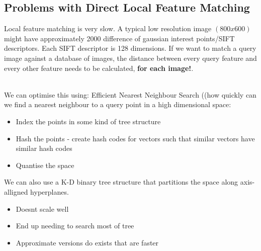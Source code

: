 \subsection{Problems with Direct Local Feature Matching}

Local feature matching is very slow. A typical low resolution image $(800x600)$ might have approximately 2000 difference of gaussian interest points/SIFT descriptors. Each SIFT descriptor is 128 dimensions. If we want to match a query image against a database of images, the distance between every query feature and every other feature needs to be calculated, \textbf{for each image!}.

\\

\noindent We can optimise this using: Efficient Nearest Neighbour Search ((how quickly can we find a nearest neighbour to a query point in a high dimensional space:

\begin{itemize}
    \itemsep0em
    \item Index the points in some kind of tree structure
    \item Hash the points - create hash codes for vectors such that similar vectors have similar hash codes
    \item Quantise the space
\end{itemize}

\noindent We can also use a K-D binary tree structure that partitions the space along axis-alligned hyperplanes. 

\begin{itemize}
    \itemsep0em
    \item Doesnt scale well
    \item End up needing to search most of tree
    \item Approximate versions do exists that are faster
    
\end{itemize}
